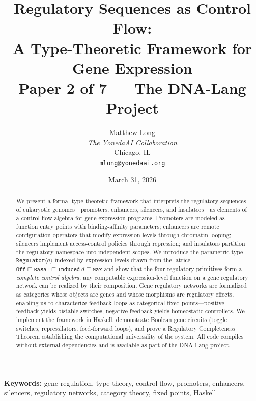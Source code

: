 \documentclass[12pt,a4paper]{article}
\newcommand{\Reg}[1]{\texttt{Regulator}\ensuremath{\langle}#1\ensuremath{\rangle}}
\begin{document}
\title{\textbf{Regulatory Sequences as Control Flow:\\A Type-Theoretic Framework for Gene Expression}\\[0.5em]
\large Paper 2 of 7 --- The DNA-Lang Project}
\author{
  Matthew Long\\
  \textit{The YonedaAI Collaboration}\\
  Chicago, IL\\
  \texttt{mlong@yonedaai.org}
}
\date{March 31, 2026}
\maketitle

\begin{abstract}
\noindent
We present a formal type-theoretic framework that interprets the regulatory sequences of eukaryotic genomes---promoters, enhancers, silencers, and insulators---as elements of a control flow algebra for gene expression programs.  Promoters are modeled as function entry points with binding-affinity parameters; enhancers are remote configuration operators that modify expression levels through chromatin looping; silencers implement access-control policies through repression; and insulators partition the regulatory namespace into independent scopes.  We introduce the parametric type $\Reg{a}$ indexed by expression levels drawn from the lattice $\texttt{Off} \sqsubseteq \texttt{Basal} \sqsubseteq \texttt{Induced}\ d \sqsubseteq \texttt{Max}$ and show that the four regulatory primitives form a \emph{complete control algebra}: any computable expression-level function on a gene regulatory network can be realized by their composition.  Gene regulatory networks are formalized as categories whose objects are genes and whose morphisms are regulatory effects, enabling us to characterize feedback loops as categorical fixed points---positive feedback yields bistable switches, negative feedback yields homeostatic controllers.  We implement the framework in Haskell, demonstrate Boolean gene circuits (toggle switches, repressilators, feed-forward loops), and prove a Regulatory Completeness Theorem establishing the computational universality of the system.  All code compiles without external dependencies and is available as part of the DNA-Lang project.
\end{abstract}

\medskip
\noindent\textbf{Keywords:} gene regulation, type theory, control flow, promoters, enhancers, silencers, regulatory networks, category theory, fixed points, Haskell
\end{document}
